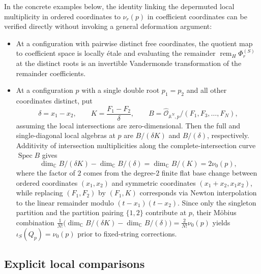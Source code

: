 \documentclass[11pt]{article}
\theoremstyle{definition}
\newcommand{\A}{\mathbb{A}}
\newcommand{\C}{\mathbb{C}}
\begin{document}
In the concrete examples below, the identity linking the depermuted local multiplicity in ordered coordinates to $\nu_r(p)$ in coefficient coordinates can be verified directly without invoking a general deformation argument:
\begin{itemize}
 \item At a configuration with pairwise distinct free coordinates, the quotient map to coefficient space is locally \'etale and evaluating the remainder $\operatorname{rem}_H\Phi_r^{(S)}$ at the distinct roots is an invertible Vandermonde transformation of the remainder coefficients.
 \item At a configuration $p$ with a single double root $p_1=p_2$ and all other coordinates distinct, put
 \[
  \delta=x_1-x_2,\qquad
  K=\frac{F_1-F_2}{\delta},\qquad
  B=\widehat{\mathcal{O}}_{\A^N,p}/(F_1,F_3,\ldots,F_N),
 \]
 assuming the local intersections are zero-dimensional. Then the full and single-diagonal local algebras at $p$ are $B/(\delta K)$ and $B/(\delta)$, respectively. Additivity of intersection multiplicities along the complete-intersection curve $\operatorname{Spec}B$ gives
 \[
  \dim_\C B/(\delta K)-\dim_\C B/(\delta)
  =\dim_\C B/(K)=2\nu_0(p),
 \]
 where the factor of $2$ comes from the degree-$2$ finite flat base change between ordered coordinates $(x_1,x_2)$ and symmetric coordinates $(x_1+x_2,x_1 x_2)$, while replacing $(F_1,F_2)$ by $(F_1,K)$ corresponds via Newton interpolation to the linear remainder modulo $(t-x_1)(t-x_2)$. Since only the singleton partition and the partition pairing $\{1,2\}$ contribute at $p$, their M\"obius combination $\frac{1}{N!}\bigl(\dim_\C B/(\delta K)-\dim_\C B/(\delta)\bigr)=\frac{2}{N!}\nu_0(p)$ yields $\iota_S(Q_p)=\nu_0(p)$ prior to fixed-string corrections.
\end{itemize}

\subsection{Explicit local comparisons}
\label{app:spin-S-local-examples}
\end{document}
